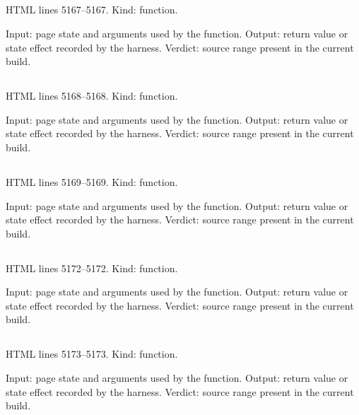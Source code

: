 \subsection*{\texttt{}}
\label{vf_232_catColour}
HTML lines 5167--5167. Kind: function.

Input: page state and arguments used by the function.
Output: return value or state effect recorded by the harness.
Verdict: source range present in the current build.

\subsection*{\texttt{}}
\label{vf_233_sopColour}
HTML lines 5168--5168. Kind: function.

Input: page state and arguments used by the function.
Output: return value or state effect recorded by the harness.
Verdict: source range present in the current build.

\subsection*{\texttt{}}
\label{vf_234_sopLabel}
HTML lines 5169--5169. Kind: function.

Input: page state and arguments used by the function.
Output: return value or state effect recorded by the harness.
Verdict: source range present in the current build.

\subsection*{\texttt{}}
\label{vf_235_gRunWells}
HTML lines 5172--5172. Kind: function.

Input: page state and arguments used by the function.
Output: return value or state effect recorded by the harness.
Verdict: source range present in the current build.

\subsection*{\texttt{}}
\label{vf_236_gTargets}
HTML lines 5173--5173. Kind: function.

Input: page state and arguments used by the function.
Output: return value or state effect recorded by the harness.
Verdict: source range present in the current build.

